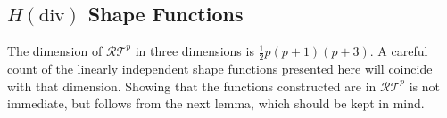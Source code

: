 %


\subsection{\texorpdfstring{$H(\mathrm{div})$}{Hdiv} Shape Functions}


The dimension of $\mathcal{RT}^p$ in three dimensions is $\frac{1}{2}p(p+1)(p+3)$.
A careful count of the linearly independent shape functions presented here will coincide with that dimension. 
Showing that the functions constructed are in $\mathcal{RT}^p$ is not immediate, but follows from the next lemma, which should be kept in mind.

